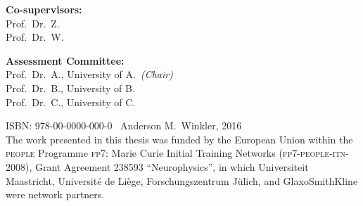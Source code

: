 \vspace*{5mm}

\noindent
\textbf{Co-supervisors:}\\
Prof.\ Dr.\ Z.\\
Prof.\ Dr.\ W.

\vspace*{5mm}

\noindent
\textbf{Assessment Committee:}\\
Prof.\ Dr.\ A., University of A.\ \emph{(Chair)}\\
Prof.\ Dr.\ B., University of B.\\
Prof.\ Dr.\ C., University of C.

\vfill

\noindent
ISBN: 978-00-0000-000-0 \textcopyright\ Anderson M.\ Winkler, 2016\\
The work presented in this thesis was funded by the European Union within the \textsc{people} Programme \textsc{fp7}: Marie Curie Initial Training Networks (\textsc{fp7-people-itn-2008}), Grant Agreement 238593 ``Neurophysics'', in which Universiteit Maas\-tricht, Universit\'{e} de Li\`{e}ge, Forschungszentrum J\"{u}lich, and GlaxoSmithKline were network partners.

